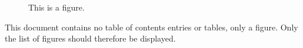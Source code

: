 \documentclass[lot,lof]{fithesis3}
\begin{document}
  \begin{figure}
    \caption{This is a figure.}
  \end{figure}
  This document contains no table of contents entries or tables,
  only a figure. Only the list of figures should therefore be
  displayed.
\end{document}
